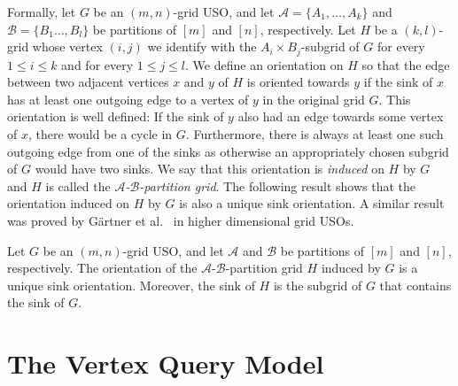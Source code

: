 \documentclass[runningheads,a4paper]{llncs}
\newcommand{\A}{\ensuremath{\mathcal A}}
\newcommand{\B}{\ensuremath{\mathcal B}}
\newcommand{\abpart}{$\A$-$\B$-partition grid\xspace}
\begin{document}
Formally, let $G$ be an $(m,n)$-grid USO,
and let $\A = \{A_1,\ldots,A_k\}$ and $\B = \{B_1\ldots, B_l\}$ be partitions of $[m]$ and $[n]$, respectively.
Let $H$ be a $(k,l)$-grid whose vertex $(i,j)$ we identify with the $A_i \times B_j$-subgrid of $G$ for every $1\leq i \leq k$ and for every $1 \leq j \leq l$. 
We define an orientation on $H$ so that the edge between two adjacent vertices $x$ and $y$ of $H$ is oriented towards $y$ if the sink of $x$ has at least one outgoing edge to a vertex of $y$ in the original grid $G$. 
This orientation is well defined: If the sink of $y$ also had an edge towards some vertex of $x$, there would be a cycle in $G$. 
Furthermore, there is always at least one such outgoing edge from one of the sinks as otherwise an appropriately chosen subgrid of $G$ would have two sinks. 
We say that this orientation is \emph{induced} on $H$ by $G$ and $H$ is called the \emph{\abpart}. 
The following result shows that the orientation induced on $H$ by $G$ is also a unique sink orientation. 
A similar result was proved by G\"artner et al.~\cite{grid08} in higher dimensional grid USOs.




\begin{lemma}\label{lemma:USO-Lemma}
Let $G$ be an $(m,n)$-grid USO,
and let $\A$ and $\B$ be partitions of $[m]$ and $[n]$, respectively.
The orientation of the $\A$-$\B$-partition grid $H$ induced by $G$ is a unique sink orientation.
Moreover, the sink of $H$ is the subgrid of $G$ that contains the sink of $G$.
\end{lemma}


\section{The Vertex Query Model}
\label{section:The vertex query model}
\end{document}
